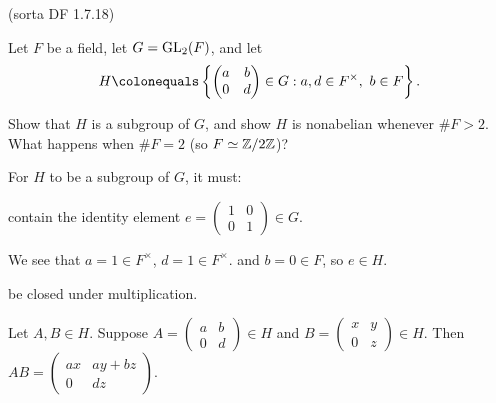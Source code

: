 \begin{problem} \textsf{(sorta DF 1.7.18)}

  \noindent
  Let $F$ be a field, let $G=\mathrm{GL}_2(F)$, and let 
  \begin{equation*}
    H \colonequals \left\{
    \begin{pmatrix}
      a & b \\
      0 & d
    \end{pmatrix}
    \in G : a,d \in F^\times,\ b \in F\right\}. 
  \end{equation*}
  \begin{enumalph}
    \item Show that $H$ is a subgroup of $G$,
    and show $H$ is nonabelian whenever $\#F > 2$.
    What happens when $\#F=2$ (so $F \simeq \mathbb{Z}/2\mathbb{Z}$)?
    \begin{Answer}
      
      For $H$ to be a subgroup of $G$, it must:
      \begin{enumalph}
        \item contain the identity element $e = 
        \left(
          \begin{smallmatrix}
            1 & 0 \\
            0 & 1
          \end{smallmatrix}
        \right)
        \in G$.

          We see that $a = 1 \in F^\times$, $d = 1 \in F^\times$.
          and $b = 0 \in F$, so $e \in H$.
        \item be closed under multiplication.

          Let $A,B \in H$.
          Suppose $A = \left(
            \begin{smallmatrix}
              a & b \\
              0 & d
            \end{smallmatrix}
          \right)
          \in H$ and $B = \left(
            \begin{smallmatrix}
              x & y \\
              0 & z
            \end{smallmatrix}
          \right)
          \in H$.
          Then $AB = \left(
            \begin{smallmatrix}
              ax & ay + bz \\
              0 & dz
            \end{smallmatrix}
          \right)$.


\end{enumalph}
\end{Answer}
\end{enumalph}
\end{problem}
